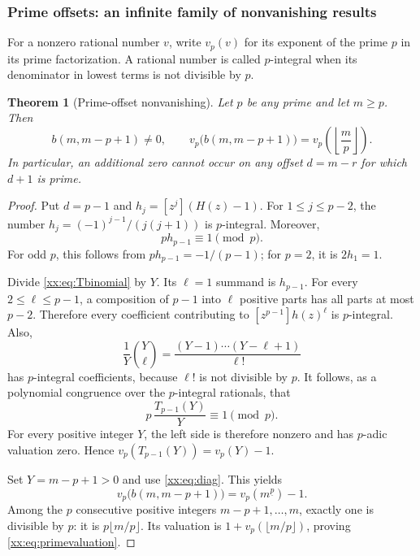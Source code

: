 \documentclass[11pt,a4paper]{article}
\numberwithin{equation}{section}
\newtheorem{theorem}{Theorem}[section]
\theoremstyle{definition}
\theoremstyle{remark}
\theoremstyle{plain}
\newcommand{\coef}[2]{[#1^{#2}]}
\newcommand{\fall}[2]{#1^{\underline{#2}}}
\begin{document}
\subsubsection{Prime offsets: an infinite family of nonvanishing results}
For a nonzero rational number $v$, write $v_p(v)$ for its exponent of the
prime $p$ in its prime factorization. A rational number is called
$p$-integral when its denominator in lowest terms is not divisible by $p$.

\begin{theorem}[Prime-offset nonvanishing]\label{xx:thm:prime}
Let $p$ be any prime and let $m\ge p$. Then
\begin{equation}\label{xx:eq:primevaluation}
 b(m,m-p+1)\ne0,\qquad
 v_p\bigl(b(m,m-p+1)\bigr)=v_p\left(\left\lfloor\frac mp\right\rfloor\right).
\end{equation}
In particular, an additional zero cannot occur on any offset $d=m-r$
for which $d+1$ is prime.
\end{theorem}
\begin{proof}
Put $d=p-1$ and $h_j=\coef{z}{j}(H(z)-1)$.
For $1\le j\le p-2$, the number
$h_j=(-1)^{j-1}/(j(j+1))$ is $p$-integral. Moreover,
\[
 p h_{p-1}\equiv1\pmod p.
\]
For odd $p$, this follows from $p h_{p-1}=-1/(p-1)$; for $p=2$, it is
$2h_1=1$.

Divide \eqref{xx:eq:Tbinomial} by $Y$. Its $\ell=1$ summand is $h_{p-1}$.
For every $2\le\ell\le p-1$, a composition of $p-1$ into $\ell$ positive
parts has all parts at most $p-2$. Therefore every coefficient contributing
to $\coef{z}{p-1}h(z)^\ell$ is $p$-integral. Also,
\[
 \frac1Y\binom Y\ell
 =\frac{(Y-1)\cdots(Y-\ell+1)}{\ell!}
\]
has $p$-integral coefficients, because $\ell!$ is not divisible by $p$.
It follows, as a polynomial congruence over the $p$-integral rationals, that
\begin{equation}\label{xx:eq:punit}
 p\,\frac{T_{p-1}(Y)}Y\equiv1\pmod p.
\end{equation}
For every positive integer $Y$, the left side is therefore nonzero and has
$p$-adic valuation zero. Hence
$v_p(T_{p-1}(Y))=v_p(Y)-1$.

Set $Y=m-p+1>0$ and use \eqref{xx:eq:diag}. This yields
\[
 v_p\bigl(b(m,m-p+1)\bigr)=v_p(\fall m p)-1.
\]
Among the $p$ consecutive positive integers $m-p+1,\ldots,m$, exactly one
is divisible by $p$: it is $p\lfloor m/p\rfloor$. Its valuation is
$1+v_p(\lfloor m/p\rfloor)$, proving \eqref{xx:eq:primevaluation}.
\end{proof}
\end{document}
